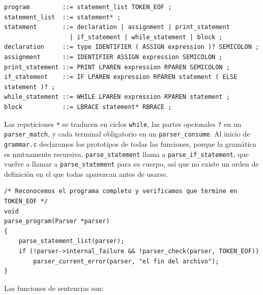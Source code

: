 \documentclass[12pt,letterpaper]{article}
\begin{document}
\begin{verbatim}
program         ::= statement_list TOKEN_EOF ;
statement_list  ::= statement* ;
statement       ::= declaration | assignment | print_statement
                  | if_statement | while_statement | block ;
declaration     ::= type IDENTIFIER ( ASSIGN expression )? SEMICOLON ;
assignment      ::= IDENTIFIER ASSIGN expression SEMICOLON ;
print_statement ::= PRINT LPAREN expression RPAREN SEMICOLON ;
if_statement    ::= IF LPAREN expression RPAREN statement ( ELSE statement )? ;
while_statement ::= WHILE LPAREN expression RPAREN statement ;
block           ::= LBRACE statement* RBRACE ;
\end{verbatim}

Las repeticiones \texttt{*} se traducen en ciclos \texttt{while}, las partes opcionales \texttt{?} en un
\texttt{parser\_match}, y cada terminal obligatorio en un \texttt{parser\_consume}. Al inicio de
\texttt{grammar.c} declaramos los prototipos de todas las funciones, porque la gramática es mutuamente
recursiva, \texttt{parse\_statement} llama a \texttt{parse\_if\_statement}, que vuelve a llamar a
\texttt{parse\_statement} para su cuerpo, así que no existe un orden de definición en el que todas aparezcan
antes de usarse.

\begin{lstlisting}[style=modernc, caption={Función \texttt{parse\_program}, único punto de entrada de \texttt{grammar.c}.}]
/* Reconocemos el programa completo y verificamos que termine en TOKEN_EOF */
void
parse_program(Parser *parser)
{
    parse_statement_list(parser);
    if (!parser->internal_failure && !parser_check(parser, TOKEN_EOF))
        parser_current_error(parser, "el fin del archivo");
}
\end{lstlisting}

\bigskip

Las funciones de sentencias son:
\end{document}

